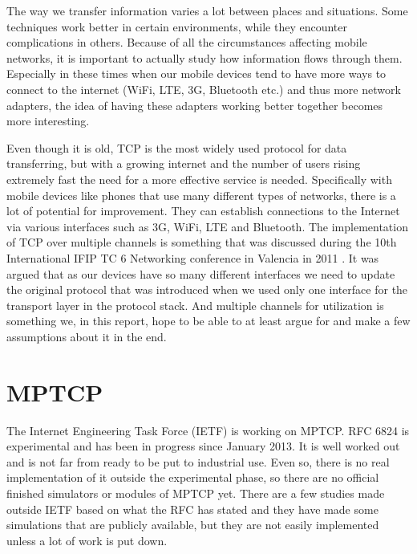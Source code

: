 \documentclass[11pt,twocolumn]{article}
\begin{document}
The way we transfer information varies a lot between places and situations. Some techniques work better in certain environments, while they encounter complications in others. Because of all the circumstances affecting mobile networks, it is important to actually study how information flows through them. Especially in these times when our mobile devices tend to have more ways to connect to the internet (WiFi, LTE, 3G, Bluetooth etc.) and thus more network adapters, the idea of having these adapters working better together becomes more interesting.

Even though it is old, TCP is the most widely used protocol for data transferring, but with a growing internet and the number of users rising extremely fast the need for a more effective service is needed. Specifically with mobile devices like phones that use many different types of networks, there is a lot of potential for improvement. They can establish connections to the Internet via various interfaces such as 3G, WiFi, LTE and Bluetooth. The implementation of TCP over multiple channels is something that was discussed during the 10th International IFIP TC 6 Networking conference in Valencia in 2011 \cite{RFC6824}. It was argued that as our devices have so many different interfaces we need to update the original protocol that was introduced when we used only one interface for the transport layer in the protocol stack. And multiple channels for utilization is something we, in this report, hope to be able to at least argue for and make a few assumptions about it in the end.



\section{MPTCP}
The Internet Engineering Task Force (IETF) is working on MPTCP. RFC 6824 is experimental and has been in progress since January 2013. It is well worked out and is not far from ready to be put to industrial use. Even so, there is no real implementation of it outside the experimental phase, so there are no official finished simulators or modules of MPTCP yet. There are a few studies made outside IETF based on what the RFC has stated and they have made some simulations that are publicly available, but they are not easily implemented unless a lot of work is put down.
\end{document}
